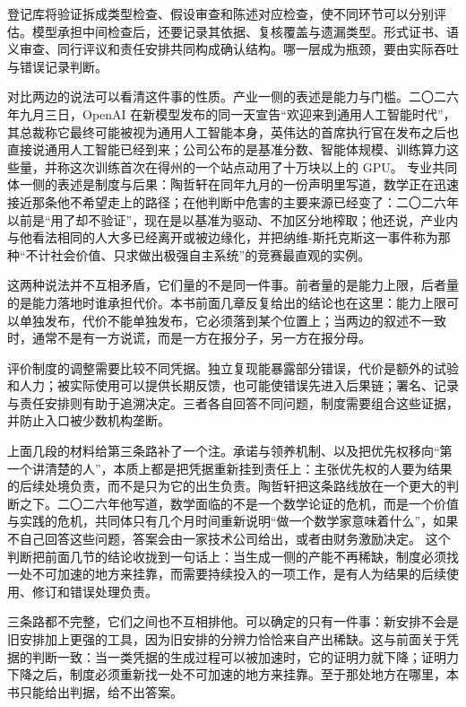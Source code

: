 登记库将验证拆成类型检查、假设审查和陈述对应检查，使不同环节可以分别评估。模型承担中间检查后，还要记录其依据、复核覆盖与遗漏类型。形式证书、语义审查、同行评议和责任安排共同构成确认结构。哪一层成为瓶颈，要由实际吞吐与错误记录判断。

对比两边的说法可以看清这件事的性质。产业一侧的表述是能力与门槛。二〇二六年九月三日，OpenAI 在新模型发布的同一天宣告“欢迎来到通用人工智能时代”，其总裁称它最终可能被视为通用人工智能本身，英伟达的首席执行官在发布之后也直接说通用人工智能已经到来；公司公布的是基准分数、智能体规模、训练算力这些量，并称这次训练首次在得州的一个站点动用了十万块以上的 GPU。\cite{openai2026pathastra,axios2026agi,huang2026agi} 专业共同体一侧的表述是制度与后果：陶哲轩在同年九月的一份声明里写道，数学正在迅速接近那条他不希望走上的路径；在他判断中危害的主要来源已经变了：二〇二六年以前是“用了却不验证”，现在是以基准为驱动、不加区分地榨取；他还说，产业内与他看法相同的人大多已经离开或被边缘化，并把纳维-斯托克斯这一事件称为那种“不计社会价值、只求做出极强自主系统”的竞赛最直观的实例。\cite{tao2026statement}

这两种说法并不互相矛盾，它们量的不是同一件事。前者量的是能力上限，后者量的是能力落地时谁承担代价。本书前面几章反复给出的结论也在这里：能力上限可以单独发布，代价不能单独发布，它必须落到某个位置上；当两边的叙述不一致时，通常不是有一方说谎，而是一方在报分子，另一方在报分母。

评价制度的调整需要比较不同凭据。独立复现能暴露部分错误，代价是额外的试验和人力；被实际使用可以提供长期反馈，也可能使错误先进入后果链；署名、记录与责任安排则有助于追溯决定。三者各自回答不同问题，制度需要组合这些证据，并防止入口被少数机构垄断。

上面几段的材料给第三条路补了一个注。承诺与领养机制、以及把优先权移向“第一个讲清楚的人”，本质上都是把凭据重新挂到责任上：主张优先权的人要为结果的后续处境负责，而不是只为它的出生负责。陶哲轩把这条路线放在一个更大的判断之下。二〇二六年他写道，数学面临的不是一个数学论证的危机，而是一个价值与实践的危机，共同体只有几个月时间重新说明“做一个数学家意味着什么”，如果不自己回答这些问题，答案会由一家技术公司给出，或者由财务激励决定。\cite{tao2026icm,tao2026nature} 这个判断把前面几节的结论收拢到一句话上：当生成一侧的产能不再稀缺，制度必须找一处不可加速的地方来挂靠，而需要持续投入的一项工作，是有人为结果的后续使用、修订和错误处理负责。

三条路都不完整，它们之间也不互相排他。可以确定的只有一件事：新安排不会是旧安排加上更强的工具，因为旧安排的分辨力恰恰来自产出稀缺。这与前面关于凭据的判断一致：当一类凭据的生成过程可以被加速时，它的证明力就下降；证明力下降之后，制度必须重新找一处不可加速的地方来挂靠。至于那处地方在哪里，本书只能给出判据，给不出答案。


